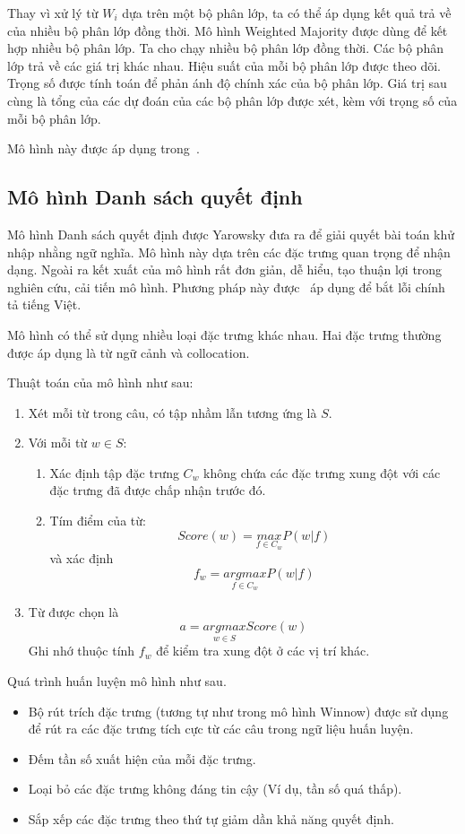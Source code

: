 \documentclass[a4paper,oneside,14pt]{extbook} %
\begin{document}
Thay vì xử lý từ $W_i$ dựa trên một bộ phân lớp, ta có thể áp dụng kết
quả trả về của nhiều bộ phân lớp đồng thời. Mô hình Weighted Majority
được dùng để kết hợp nhiều bộ phân lớp. Ta cho chạy nhiều bộ phân lớp
đồng thời. Các bộ phân lớp trả về các giá trị khác nhau. Hiệu suất của
mỗi bộ phân lớp được theo dõi. Trọng số được tính toán để phản ánh độ
chính xác của bộ phân lớp. Giá trị sau cùng là tổng của các dự đoán
của các bộ phân lớp được xét, kèm với trọng số của mỗi bộ phân lớp.

Mô hình này được áp dụng trong~\cite{Golding99}.

\subsection{Mô hình Danh sách quyết định}

Mô hình Danh sách quyết định được Yarowsky đưa ra để giải quyết bài
toán khử nhập nhằng ngữ nghĩa. Mô hình này dựa trên các đặc trưng quan
trọng để nhận dạng. Ngoài ra kết xuất của mô hình rất đơn giản, dễ
hiểu, tạo thuận lợi trong nghiên cứu, cải tiến mô hình. Phương pháp
này được~\cite{vietdecisionlist} áp dụng để bắt lỗi chính tả tiếng
Việt.

Mô hình có thể sử dụng nhiều loại đặc trưng khác nhau. Hai đặc trưng
thường được áp dụng là từ ngữ cảnh và collocation. 

Thuật toán của mô hình như sau:
\begin{enumerate}
\item Xét mỗi từ trong câu, có tập nhầm lẫn tương ứng là $S$.
\item Với mỗi từ $w \in S$:
  \begin{enumerate}
  \item Xác định tập đặc trưng $C_w$ không chứa các đặc trưng xung đột
    với các đặc trưng đã được chấp nhận trước đó.
  \item Tím điểm của từ:$$Score(w)=\underset{f\in C_w}{max}P(w|f)$$
    và xác định $$f_w = \underset{f\in C_w}{argmax}P(w|f)$$
  \end{enumerate}
\item Từ được chọn là $$a=\underset{w\in S}{argmax}Score(w)$$ Ghi nhớ
  thuộc tính $f_w$ để kiểm tra xung đột ở các vị trí khác.
\end{enumerate}

Quá trình huấn luyện mô hình như sau. 
\begin{itemize}
\item Bộ rút trích đặc trưng (tương tự
như trong mô hình Winnow) được sử dụng để rút ra các đặc trưng tích
cực từ các câu trong ngữ liệu huấn luyện.
\item  Đếm tần số xuất hiện của mỗi
đặc trưng. 
\item Loại bỏ các đặc trưng không đáng tin cậy (Ví dụ, tần số
quá thấp). 
\item Sắp xếp các đặc trưng theo thứ tự giảm dần khả năng quyết định.
\end{itemize}
\end{document}
